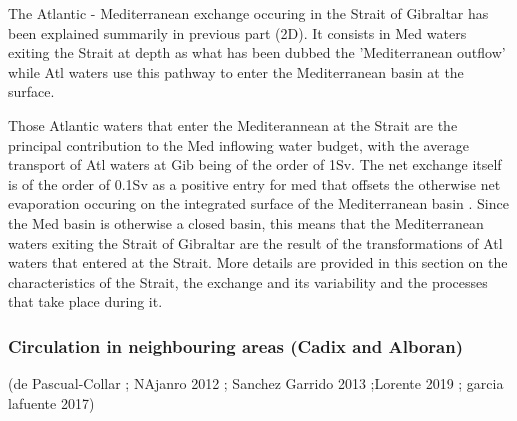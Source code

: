 The Atlantic - Mediterranean exchange occuring in the Strait of Gibraltar has been explained summarily in previous part (2D). It consists in Med waters exiting the Strait at depth as what has been dubbed the 'Mediterranean outflow' while Atl waters use this pathway to enter the Mediterranean basin at the surface.

Those Atlantic waters that enter the Mediterannean at the Strait are the principal contribution to the Med inflowing water budget, with the average transport of Atl waters at Gib being of the order of 1Sv. The net exchange itself is of the order of 0.1Sv as a positive entry for med that offsets the otherwise net evaporation occuring on the integrated surface of the Mediterranean basin \citep{bryden_1994}.
Since the Med basin is otherwise a closed basin, this means that the Mediterranean waters exiting the Strait of Gibraltar are the result of the transformations of Atl waters that entered at the Strait.
More details are provided in this section on the characteristics of the Strait, the exchange and its variability and the processes that take place during it.










\subsubsection{Circulation in neighbouring areas (Cadix and Alboran)}

(de Pascual-Collar ; NAjanro 2012 ; Sanchez Garrido 2013 ;Lorente 2019 ; garcia lafuente 2017)


